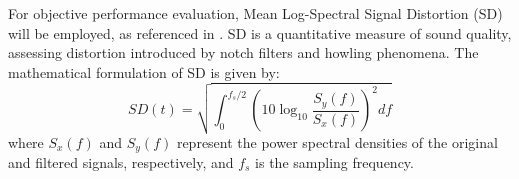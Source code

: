 For objective performance evaluation, Mean Log-Spectral Signal Distortion (SD) will be employed, as referenced in \cite{5675660}. SD is a quantitative measure of sound quality, assessing distortion introduced by notch filters and howling phenomena. The mathematical formulation of SD is given by:
\begin{equation}
SD(t) = \sqrt{\int_0^{f_s / 2} \left(10 \log_{10} \frac{S_y(f)}{S_x(f)}\right)^2 df}
\end{equation}
where \( S_x(f) \) and \( S_y(f) \) represent the power spectral densities of the original and filtered signals, respectively, and \( f_s \) is the sampling frequency.

